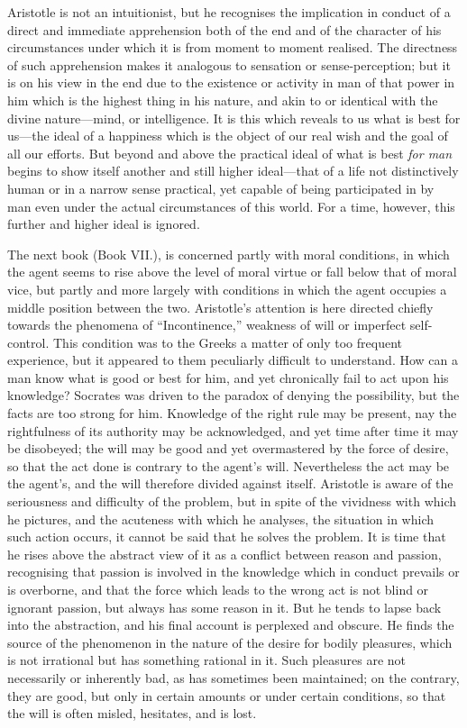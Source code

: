 Aristotle is not an intuitionist, but he recognises the implication in conduct
of a direct and immediate apprehension both of the end and of the character of
his circumstances under which it is from moment to moment realised. The
directness of such apprehension makes it analogous to sensation or
sense-perception; but it is on his view in the end due to the existence or
activity in man of that power in him which is the highest thing in his nature,
and akin to or identical with the divine nature—mind, or intelligence. It
is this which reveals to us what is best for us—the ideal of a happiness
which is the object of our real wish and the goal of all our efforts. But
beyond and above the practical ideal of what is best \emph{for man} begins to
show itself another and still higher ideal—that of a life not
distinctively human or in a narrow sense practical, yet capable of being
participated in by man even under the actual circumstances of this world. For a
time, however, this further and higher ideal is ignored.

The next book (Book VII.), is concerned partly with moral conditions, in which
the agent seems to rise above the level of moral virtue or fall below that of
moral vice, but partly and more largely with conditions in which the agent
occupies a middle position between the two. Aristotle’s attention is here
directed chiefly towards the phenomena of “Incontinence,” weakness
of will or imperfect self-control. This condition was to the Greeks a matter of
only too frequent experience, but it appeared to them peculiarly difficult to
understand. How can a man know what is good or best for him, and yet
chronically fail to act upon his knowledge? Socrates was driven to the paradox
of denying the possibility, but the facts are too strong for him. Knowledge of
the right rule may be present, nay the rightfulness of its authority may be
acknowledged, and yet time after time it may be disobeyed; the will may be good
and yet overmastered by the force of desire, so that the act done is contrary
to the agent’s will. Nevertheless the act may be the agent’s, and
the will therefore divided against itself. Aristotle is aware of the
seriousness and difficulty of the problem, but in spite of the vividness with
which he pictures, and the acuteness with which he analyses, the situation in
which such action occurs, it cannot be said that he solves the problem. It is
time that he rises above the abstract view of it as a conflict between reason
and passion, recognising that passion is involved in the knowledge which in
conduct prevails or is overborne, and that the force which leads to the wrong
act is not blind or ignorant passion, but always has some reason in it. But he
tends to lapse back into the abstraction, and his final account is perplexed
and obscure. He finds the source of the phenomenon in the nature of the desire
for bodily pleasures, which is not irrational but has something rational in it.
Such pleasures are not necessarily or inherently bad, as has sometimes been
maintained; on the contrary, they are good, but only in certain amounts or
under certain conditions, so that the will is often misled, hesitates, and is
lost.

